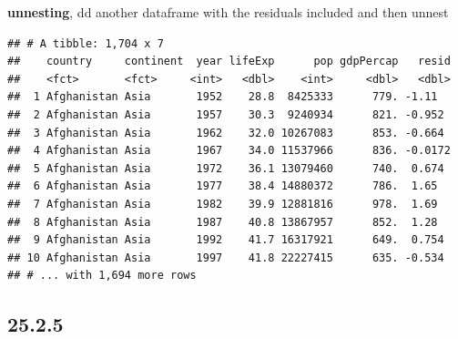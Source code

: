 \documentclass[]{book}
\newenvironment{Shaded}{\begin{snugshade}}{\end{snugshade}}
\newcommand{\DataTypeTok}[1]{\textcolor[rgb]{0.13,0.29,0.53}{#1}}
\newcommand{\KeywordTok}[1]{\textcolor[rgb]{0.13,0.29,0.53}{\textbf{#1}}}
\newcommand{\NormalTok}[1]{#1}
\newcommand{\OperatorTok}[1]{\textcolor[rgb]{0.81,0.36,0.00}{\textbf{#1}}}
\newcommand{\StringTok}[1]{\textcolor[rgb]{0.31,0.60,0.02}{#1}}
\theoremstyle{definition}
\theoremstyle{definition}
\theoremstyle{definition}
\theoremstyle{remark}
\begin{document}
\textbf{unnesting}, dd another dataframe with the residuals included and
then unnest

\begin{Shaded}
\end{Shaded}

\begin{Shaded}
\end{Shaded}

\begin{verbatim}
## # A tibble: 1,704 x 7
##    country     continent  year lifeExp      pop gdpPercap   resid
##    <fct>       <fct>     <int>   <dbl>    <int>     <dbl>   <dbl>
##  1 Afghanistan Asia       1952    28.8  8425333      779. -1.11  
##  2 Afghanistan Asia       1957    30.3  9240934      821. -0.952 
##  3 Afghanistan Asia       1962    32.0 10267083      853. -0.664 
##  4 Afghanistan Asia       1967    34.0 11537966      836. -0.0172
##  5 Afghanistan Asia       1972    36.1 13079460      740.  0.674 
##  6 Afghanistan Asia       1977    38.4 14880372      786.  1.65  
##  7 Afghanistan Asia       1982    39.9 12881816      978.  1.69  
##  8 Afghanistan Asia       1987    40.8 13867957      852.  1.28  
##  9 Afghanistan Asia       1992    41.7 16317921      649.  0.754 
## 10 Afghanistan Asia       1997    41.8 22227415      635. -0.534 
## # ... with 1,694 more rows
\end{verbatim}

\hypertarget{section-88}{%
\subsection{25.2.5}\label{section-88}}
\end{document}
